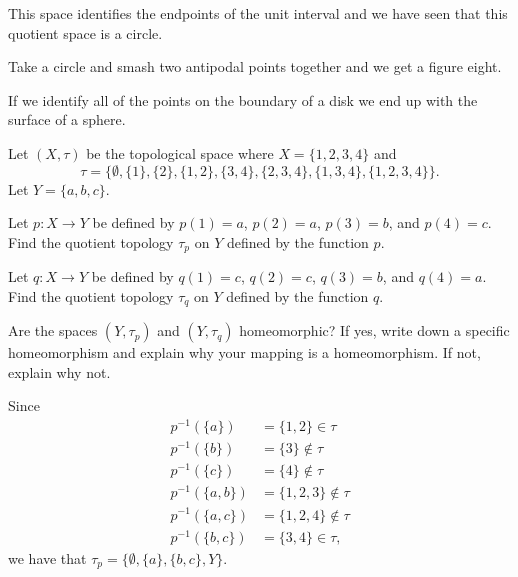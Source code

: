 \ea



\ExerciseSolution

\ba

\item This space identifies the endpoints of the unit interval and we have seen that this quotient space is a circle.

\item Take a circle and smash two antipodal points together and we get a figure eight.

\item If we identify all of the points on the boundary of a disk we end up with the surface of a sphere. 

\ea


\item Let $(X, \tau)$ be the topological space where $X = \{1, 2, 3, 4\}$ and 
\[\tau = \{\emptyset, \{1\}, \{2\}, \{1, 2\}, \{3, 4\}, \{2, 3, 4\}, \{1, 3, 4\}, \{1, 2, 3, 4\}\}.\]
Let $Y = \{a, b, c\}$.
\ba
\item Let $p: X \to Y$ be defined by $p(1)=a$, $p(2) = a$, $p(3)=b$, and $p(4) = c$. Find the quotient topology $\tau_p$ on $Y$ defined by the function $p$.

\item Let $q : X \to Y$ be defined by $q(1)=c$, $q(2) = c$, $q(3) = b$, and $q(4) = a$. Find the quotient topology $\tau_q$ on $Y$ defined by the function $q$.

\item Are the spaces $(Y, \tau_p)$ and $(Y, \tau_q)$ homeomorphic? If yes, write down a specific homeomorphism and explain why your mapping is a homeomorphism. If not, explain why not.

\ea


\ExerciseSolution

\ba
\item Since 
\begin{align*}
p^{-1}(\{a\}) &= \{1,2\} \in \tau \\
p^{-1}(\{b\}) &= \{3\} \notin \tau \\
p^{-1}(\{c\}) &= \{4\} \notin \tau \\
p^{-1}(\{a,b\}) &= \{1,2,3\} \notin \tau \\
p^{-1}(\{a,c\}) &= \{1,2,4\} \notin \tau \\
p^{-1}(\{b,c\}) &= \{3,4\} \in \tau,
\end{align*}
we have that $\tau_p = \{\emptyset, \{a\}, \{b,c\}, Y\}$. 

